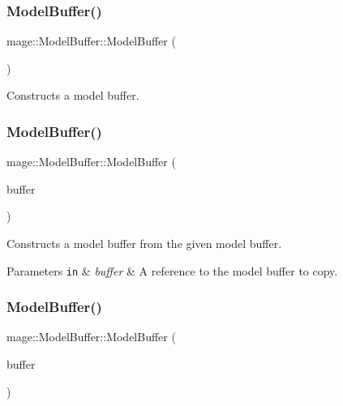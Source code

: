 \subsubsection{\texorpdfstring{Model\+Buffer()}{ModelBuffer()}\hspace{0.1cm}{\footnotesize\ttfamily [1/3]}}
{\footnotesize\ttfamily mage\+::\+Model\+Buffer\+::\+Model\+Buffer (\begin{DoxyParamCaption}{ }\end{DoxyParamCaption})}

Constructs a model buffer. \hypertarget{structmage_1_1_model_buffer_a593635ac135a8390b606e5e47174d2e5}{}\label{structmage_1_1_model_buffer_a593635ac135a8390b606e5e47174d2e5} 
\subsubsection{\texorpdfstring{Model\+Buffer()}{ModelBuffer()}\hspace{0.1cm}{\footnotesize\ttfamily [2/3]}}
{\footnotesize\ttfamily mage\+::\+Model\+Buffer\+::\+Model\+Buffer (\begin{DoxyParamCaption}\item[{const \hyperlink{structmage_1_1_model_buffer}{Model\+Buffer} \&}]{buffer }\end{DoxyParamCaption})\hspace{0.3cm}{\ttfamily [default]}}

Constructs a model buffer from the given model buffer.


\begin{DoxyParams}[1]{Parameters}
\mbox{\tt in}  & {\em buffer} & A reference to the model buffer to copy. \\
\hline
\end{DoxyParams}
\hypertarget{structmage_1_1_model_buffer_a56ec1df93cbf6505c513cf5f440fdc4f}{}\label{structmage_1_1_model_buffer_a56ec1df93cbf6505c513cf5f440fdc4f} 
\subsubsection{\texorpdfstring{Model\+Buffer()}{ModelBuffer()}\hspace{0.1cm}{\footnotesize\ttfamily [3/3]}}
{\footnotesize\ttfamily mage\+::\+Model\+Buffer\+::\+Model\+Buffer (\begin{DoxyParamCaption}\item[{\hyperlink{structmage_1_1_model_buffer}{Model\+Buffer} \&\&}]{buffer }\end{DoxyParamCaption})\hspace{0.3cm}{\ttfamily [default]}}

